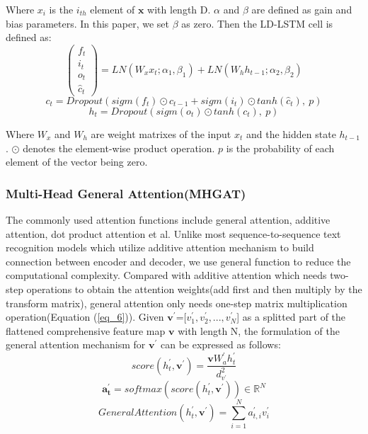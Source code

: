 \documentclass[runningheads]{llncs}
\begin{document}
Where $x_{i}$ is the $i_{th}$ element of $\mathbf{x}$ with length D. $\alpha$ and $\beta$ are defined as gain and bias parameters. In this paper, we set $\beta$ as zero. Then the LD-LSTM cell is defined as:
\begin{equation}
\label{eq_3}
\begin{pmatrix}
f_{t}\\ 
i_{t}\\ 
o_{t}\\ 
\hat{c}_{t}
\end{pmatrix}= LN(W_{x}x_{t}; \alpha _{1}, \beta _{1}) + LN(W_{h}h_{t-1}; \alpha _{2}, \beta _{2})
\end{equation}
\begin{equation}
c_{t} = Dropout\left (sigm(f_{t})\odot c_{t-1}+sigm(i_{t})\odot tanh(\hat{c}_{t}), \ p \right)
\end{equation}
\begin{equation}
h_{t} = Dropout\left (sigm(o_{t})\odot tanh(c_{t}), \ p \right )
\end{equation}

Where $W_x$ and $W_h$ are weight matrixes of the input $x_t$ and the hidden state $h_{t-1}$. $\odot$ denotes the element-wise product operation. $p$ is the probability of each element of the vector being zero.

\subsubsection{Multi-Head General Attention(MHGAT)}
The commonly used attention functions include general attention, additive attention, dot product attention et al. Unlike most sequence-to-sequence text recognition models which utilize additive attention mechanism to build connection between encoder and decoder\cite{shi2018aster,litman2020scatter,li2019show}, we use general function\cite{luong2015effective} to reduce the computational complexity. Compared with additive attention\cite{bahdanau2014neural} which needs two-step operations to obtain the attention weights(add first and then multiply by the transform matrix), general attention only needs one-step matrix multiplication operation(Equation (\ref{eq_6})). Given $\mathbf{v^{'}}$=[$v_{1}^{'}, v_{2}^{'},...,v_{N}^{'}$] as a splitted part of the flattened comprehensive feature map $\mathbf{v}$ with length N, the formulation of the general attention mechanism for $\mathbf{v^{'}}$ can be expressed as follows:
\begin{equation}
\label{eq_6}
   score(h_{t}^{'}, \mathbf{v^{'}}) = \frac{\mathbf{v}W_{a}^{'}h_{t}^{'}}{d_{v^{'}}^{2}} 
\end{equation}
\begin{equation}
\mathbf{a_{t}^{'}}=softmax(score(h_{t}^{'}, \mathbf{v^{'}})) \in \mathbb{R}^{N}
\end{equation}
\begin{equation}
GeneralAttention(h_{t}^{'}, \mathbf{v^{'}}) = \sum_{i=1}^{N}a_{t,i}^{'}v_{i}^{'}
\end{equation}
\end{document}
